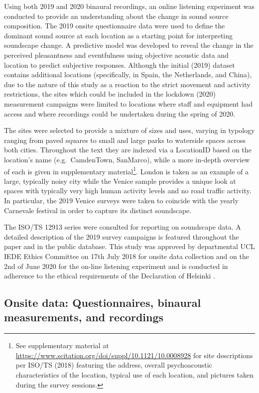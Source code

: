 \documentclass[
  authoryear,
  preprint,
  3p,
  onecolumn]{elsarticle}
\begin{document}
Using both 2019 and 2020 binaural recordings, an online listening
experiment was conducted to provide an understanding about the change in
sound source composition. The 2019 onsite questionnaire data were used
to define the dominant sound source at each location as a starting point
for interpreting soundscape change. A predictive model was developed to
reveal the change in the perceived pleasantness and eventfulness using
objective acoustic data and location to predict subjective responses.
Although the initial (2019) dataset contains additional locations
(specifically, in Spain, the Netherlands, and China), due to the nature
of this study as a reaction to the strict movement and activity
restrictions, the sites which could be included in the lockdown (2020)
measurement campaigns were limited to locations where staff and
equipment had access and where recordings could be undertaken during the
spring of 2020.

The sites were selected to provide a mixture of sizes and uses, varying
in typology ranging from paved squares to small and large parks to
waterside spaces across both cities. Throughout the text they are
indexed via a LocationID based on the location's name (e.g.~CamdenTown,
SanMarco), while a more in-depth overview of each is given in
supplementary material\footnote{See supplementary material at
  \url{https://www.scitation.org/doi/suppl/10.1121/10.0008928} for site
  descriptions per ISO/TS (2018) featuring the address, overall
  psychoacoustic characteristics of the location, typical use of each
  location, and pictures taken during the survey sessions.}. London is
taken as an example of a large, typically noisy city while the Venice
sample provides a unique look at spaces with typically very high human
activity levels and no road traffic activity. In particular, the 2019
Venice surveys were taken to coincide with the yearly Carnevale festival
in order to capture its distinct soundscape.

The ISO/TS 12913 \citep{ISO12913Part2} series were consulted for
reporting on soundscape data. A detailed description of the 2019 survey
campaigns is featured throughout the paper and in the public database.
This study was approved by departmental UCL IEDE Ethics Committee on
17th July 2018 for onsite data collection and on the 2nd of June 2020
for the on-line listening experiment and is conducted in adherence to
the ethical requirements of the Declaration of Helsinki
\citep{WMA2013World}.

\subsection{Onsite data: Questionnaires, binaural measurements, and
recordings}\label{onsite-data-questionnaires-binaural-measurements-and-recordings}
\end{document}
